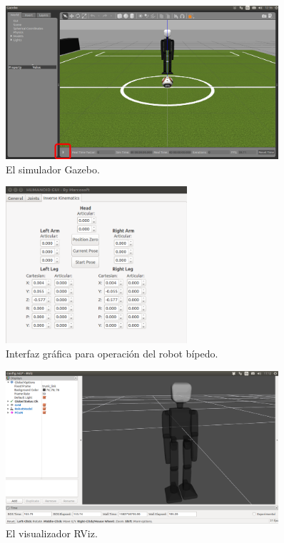 \documentclass[letterpaper,12pt]{article}
\begin{document}
\begin{figure}
\centering
\includegraphics[width=0.9\textwidth]{gazebo_initial.png}
\caption{El simulador Gazebo.}
\label{fig:gazebo}
\end{figure}

\begin{figure}
\centering
\includegraphics[width=0.6\textwidth]{gui.png}
\caption{Interfaz gráfica para operación del robot bípedo.}
\label{fig:gui}
\end{figure}

\begin{figure}
\centering
\includegraphics[width=0.9\textwidth]{rviz.png}
\caption{El visualizador RViz.}
\label{fig:rviz}
\end{figure}
\end{document}
